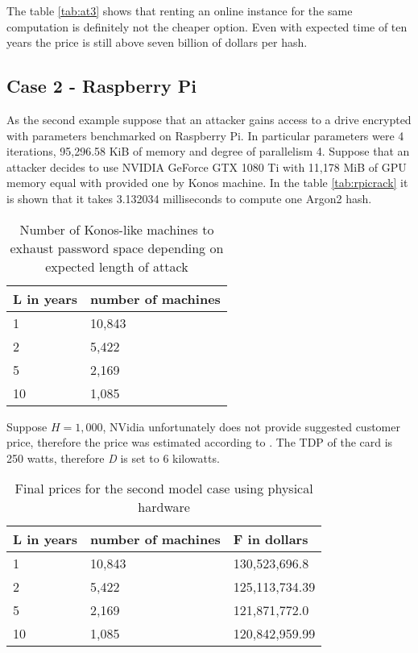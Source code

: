 \documentclass[nolof]{fithesis3}
\begin{document}
The table \ref{tab:at3} shows that renting an online instance for the same computation is definitely not the cheaper option. Even with expected time of ten years the price is still above seven billion of dollars per hash.

\FloatBarrier

\subsection{Case 2 - Raspberry Pi}
As the second example suppose that an attacker gains access to a drive encrypted with parameters benchmarked on Raspberry Pi. In particular parameters were 4 iterations, 95,296.58 KiB of memory and degree of parallelism 4. Suppose that an attacker decides to use NVIDIA GeForce GTX 1080 Ti with 11,178 MiB of GPU memory equal with provided one by Konos machine. In the table \ref{tab:rpicrack} it is shown that it takes 3.132034 milliseconds to compute one Argon2 hash.

\noindent
\begin{table}
\caption{Number of Konos-like machines to exhaust password space depending on expected length of attack}
\label{tab:at4}
\begin{tabularx}{\textwidth}{| X | X |}
\hline
L in years & number of machines\\
\hline
1 & 10,843\\	
\hline
2 & 5,422\\
\hline
5 & 2,169\\
\hline
10 & 1,085\\
\hline
\end{tabularx}
\end{table}

Suppose $H = 1,000$, NVidia unfortunately does not provide suggested customer price, therefore the price was estimated according to \parencite{geforceprice}. The TDP of the card is 250 watts, therefore \emph{D} is set to 6 kilowatts.

\noindent
\begin{table}
\caption{Final prices for the second model case using physical hardware}
\label{tab:at5}
\begin{tabularx}{\textwidth}{| X | X | X |}
\hline
L  in years & number of machines & F in dollars\\
\hline
1 & 10,843 & 130,523,696.8\\
\hline
2 & 5,422 & 125,113,734.39\\
\hline
5 & 2,169 & 121,871,772.0\\
\hline
10 & 1,085 & 120,842,959.99\\
\hline
\end{tabularx}
\end{table}
\end{document}
